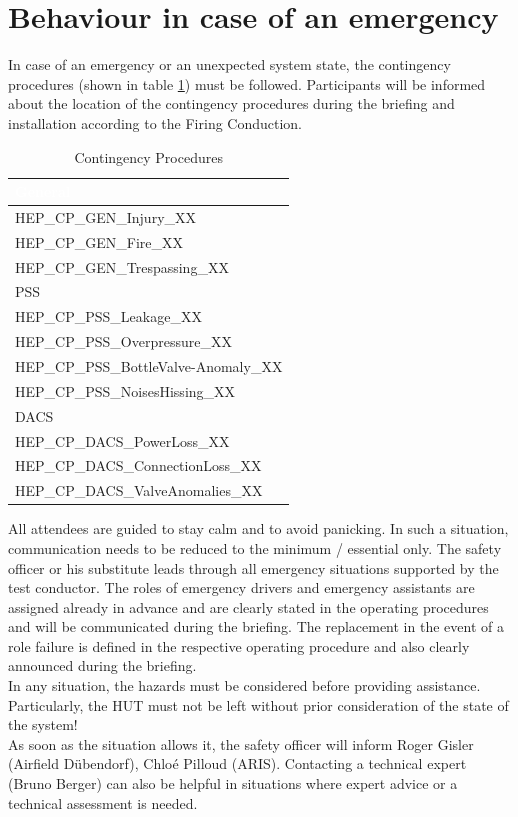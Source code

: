 \documentclass{article}
\begin{document}
\section{Behaviour in case of an emergency} \label{emergency-behaviour}
In case of an emergency or an unexpected system state, the contingency procedures (shown in table \ref{tab:contingency-procedures}) must be followed. Participants will be informed about the location of the contingency procedures during the briefing and installation according to the Firing Conduction.
\begin{table}[h]
    \caption{Contingency Procedures}
    \label{tab:contingency-procedures}
    \begin{tabularx}{0.9\textwidth}{|X|}
        \cellcolor{blue} \textcolor{white}{General} \\ \hline
        HEP\_CP\_GEN\_Injury\_XX \\ \hline
        HEP\_CP\_GEN\_Fire\_XX \\ \hline
        HEP\_CP\_GEN\_Trespassing\_XX \\ \hline
        \cellcolor{orange} PSS \\ \hline
        HEP\_CP\_PSS\_Leakage\_XX \\ \hline
        HEP\_CP\_PSS\_Overpressure\_XX \\ \hline
        HEP\_CP\_PSS\_BottleValve-Anomaly\_XX \\ \hline
        HEP\_CP\_PSS\_NoisesHissing\_XX \\ \hline
        \cellcolor{yellow} DACS \\ \hline
        HEP\_CP\_DACS\_PowerLoss\_XX \\ \hline
        HEP\_CP\_DACS\_ConnectionLoss\_XX \\ \hline
        HEP\_CP\_DACS\_ValveAnomalies\_XX \\ \hline
    \end{tabularx}
\end{table}
All attendees are guided to stay calm and to avoid panicking. In such a situation, communication needs to be reduced to the minimum / essential only. The safety officer or his substitute leads through all emergency situations supported by the test conductor. The roles of emergency drivers and emergency assistants are assigned already in advance and are clearly stated in the operating procedures and will be communicated during the briefing. The replacement in the event of a role failure is defined in the respective operating procedure and also clearly announced during the briefing. \\
\noindent
In any situation, the hazards must be considered before providing assistance. Particularly, the HUT must not be left without prior consideration of the state of the system! \\
\noindent
As soon as the situation allows it, the safety officer will inform Roger Gisler (Airfield Dübendorf), Chloé Pilloud (ARIS). Contacting a technical expert (Bruno Berger) can also be helpful in situations where expert advice or a technical assessment is needed. 
\end{document}
